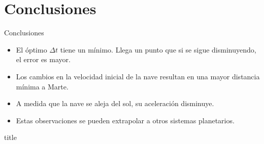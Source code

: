 \documentclass{beamer}
\begin{document}
    \section{Conclusiones}

        \begin{frame}{Conclusiones}
            \begin{itemize}
                \item El óptimo $\Delta t$ tiene un mínimo.
                Llega un punto que si se sigue disminuyendo, el error es mayor.
                \item Los cambios en la velocidad inicial de la nave resultan en una mayor distancia mínima a Marte.
                \item A medida que la nave se aleja del sol, su aceleración disminuye.
                \item Estas observaciones se pueden extrapolar a otros sistemas planetarios.
            \end{itemize}
        \end{frame}

        \begin{frame}
            \begin{beamercolorbox}[sep=8pt,center]{title}
            \end{beamercolorbox}
        \end{frame}
\end{document}
